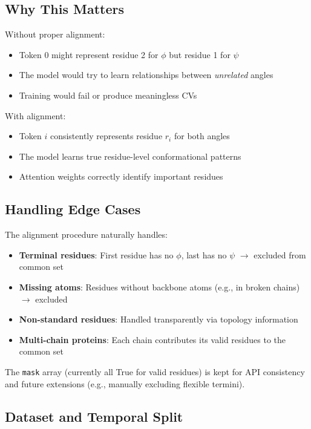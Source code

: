 \documentclass[12pt,a4paper]{article}
\begin{document}
\subsection{Why This Matters}

Without proper alignment:
\begin{itemize}
    \item Token 0 might represent residue 2 for $\phi$ but residue 1 for $\psi$
    \item The model would try to learn relationships between \textit{unrelated} angles
    \item Training would fail or produce meaningless CVs
\end{itemize}

With alignment:
\begin{itemize}
    \item Token $i$ consistently represents residue $r_i$ for both angles
    \item The model learns true residue-level conformational patterns
    \item Attention weights correctly identify important residues
\end{itemize}

\subsection{Handling Edge Cases}

The alignment procedure naturally handles:
\begin{itemize}
    \item \textbf{Terminal residues}: First residue has no $\phi$, last has no $\psi$ $\rightarrow$ excluded from common set
    \item \textbf{Missing atoms}: Residues without backbone atoms (e.g., in broken chains) $\rightarrow$ excluded
    \item \textbf{Non-standard residues}: Handled transparently via topology information
    \item \textbf{Multi-chain proteins}: Each chain contributes its valid residues to the common set
\end{itemize}

The \texttt{mask} array (currently all True for valid residues) is kept for API consistency and future extensions (e.g., manually excluding flexible termini).

\subsection{Dataset and Temporal Split}
\end{document}
